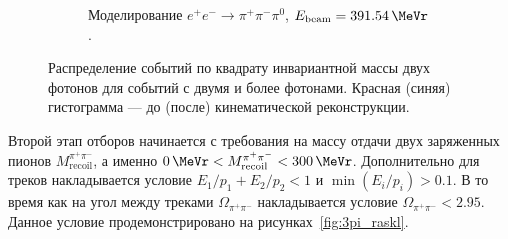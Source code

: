 \begin{figure}[htbp]
\begin{subfigure}[t]{0.45\textwidth}
        \caption{Моделирование $e^+ e^- \to \pi^+ \pi^- \pi^0$, $E_{\text{beam}} = \SI{391.54}{\MeVr}$.}
        \label{fig:3pi_diff_kf_mpi0_sim391_54}
    \end{subfigure}
    \caption{Распределение событий по квадрату инвариантной массы двух фотонов для событий с двумя и более фотонами.
    Красная (синяя) гистограмма --- до (после) кинематической реконструкции.}\label{fig:3pi_diff_kf_mpi0}
\end{figure}

 
Второй этап отборов начинается с требования на массу отдачи двух заряженных пионов $M_{\text{recoil}}^{\pi^+ \pi^-}$,
а именно $\SI{0}{\MeVr} < M_{\text{recoil}}^{\pi^+ \pi^-} < \SI{300}{\MeVr}$.
Дополнительно для треков накладывается условие
$ E_1/p_1 + E_2 / p_2 < 1$
и $\min(E_i / p_i) > 0.1$.
В то время как на угол между треками $\Omega_{\pi^+ \pi^-}$ накладывается условие $\Omega_{\pi^+ \pi^-} < 2.95$.
Данное условие продемонстрировано на рисунках~\ref{fig:3pi_raskl}.
